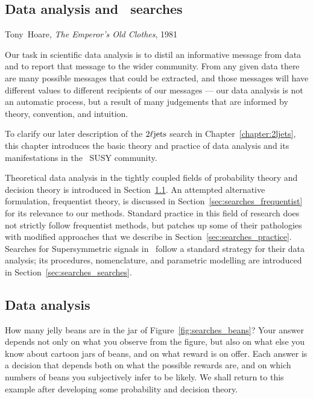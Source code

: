 \begin{singlespacing}
\chapter{Data analysis and \atlas\ searches}
\label{chapter:searches}
\begin{epigraphs}
%
{Tony~Hoare,
\textit{The Emperor’s Old Clothes},
1981~\cite{hoare2007emperor}}
\end{epigraphs}
\end{singlespacing}

Our task in scientific data analysis is to distil an informative
message from data and to report that message to the wider community.
From any given data there are many possible messages that could be extracted,
and those messages will have different values to different recipients of our
messages --- our data analysis is not an automatic process, but a result
of many judgements that are informed by theory, convention, and intuition.

To clarify our later description of the $2\ell\mathrm{jets}$ search in
Chapter~\ref{chapter:2ljets}, this chapter introduces the basic theory and
practice of data analysis and its manifestations in the \atlas\ SUSY community.

Theoretical data analysis in the tightly coupled fields of probability theory
and decision theory is introduced in Section~\ref{sec:searches_data_analysis}.
An attempted alternative formulation, frequentist theory, is discussed in
Section~\ref{sec:searches_frequentist} for its relevance to our methods.
Standard practice in this field of research does not strictly follow
frequentist methods, but patches up some of their pathologies with modified
approaches that we describe in Section~\ref{sec:searches_practice}.
Searches for Supersymmetric signals in \atlas\ follow a standard strategy for
their data analysis; its procedures, nomenclature, and parametric modelling
are introduced in Section~\ref{sec:searches_searches}.


\section{Data analysis}
\label{sec:searches_data_analysis}
How many jelly beans are in the jar of Figure~\ref{fig:searches_beans}?
Your answer depends not only on what you observe from the figure, but also on
what else you know about cartoon jars of beans, and on what reward is on offer.
Each answer is a decision that depends both on what the possible rewards are,
and on which numbers of beans you subjectively infer to be likely.
We shall return to this example after developing some probability and decision
theory.

